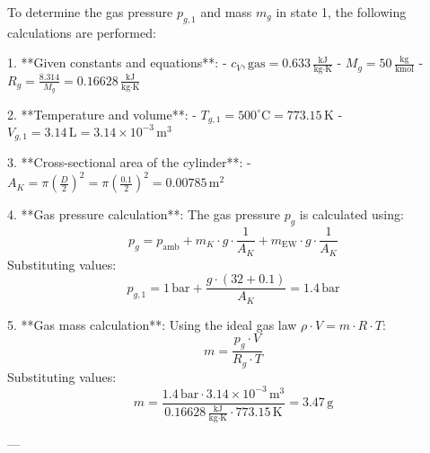To determine the gas pressure \( p_{g,1} \) and mass \( m_g \) in state 1, the following calculations are performed:

1. **Given constants and equations**:  
   - \( c_V, \text{gas} = 0.633 \, \frac{\text{kJ}}{\text{kg·K}} \)  
   - \( M_g = 50 \, \frac{\text{kg}}{\text{kmol}} \)  
   - \( R_g = \frac{8.314}{M_g} = 0.16628 \, \frac{\text{kJ}}{\text{kg·K}} \)  

2. **Temperature and volume**:  
   - \( T_{g,1} = 500^\circ\text{C} = 773.15 \, \text{K} \)  
   - \( V_{g,1} = 3.14 \, \text{L} = 3.14 \times 10^{-3} \, \text{m}^3 \)  

3. **Cross-sectional area of the cylinder**:  
   - \( A_K = \pi \left(\frac{D}{2}\right)^2 = \pi \left(\frac{0.1}{2}\right)^2 = 0.00785 \, \text{m}^2 \)  

4. **Gas pressure calculation**:  
   The gas pressure \( p_g \) is calculated using:  
   \[
   p_g = p_{\text{amb}} + m_K \cdot g \cdot \frac{1}{A_K} + m_{\text{EW}} \cdot g \cdot \frac{1}{A_K}
   \]  
   Substituting values:  
   \[
   p_{g,1} = 1 \, \text{bar} + \frac{g \cdot (32 + 0.1)}{A_K} = 1.4 \, \text{bar}
   \]  

5. **Gas mass calculation**:  
   Using the ideal gas law \( \rho \cdot V = m \cdot R \cdot T \):  
   \[
   m = \frac{p_g \cdot V}{R_g \cdot T}
   \]  
   Substituting values:  
   \[
   m = \frac{1.4 \, \text{bar} \cdot 3.14 \times 10^{-3} \, \text{m}^3}{0.16628 \, \frac{\text{kJ}}{\text{kg·K}} \cdot 773.15 \, \text{K}} = 3.47 \, \text{g}
   \]  

---